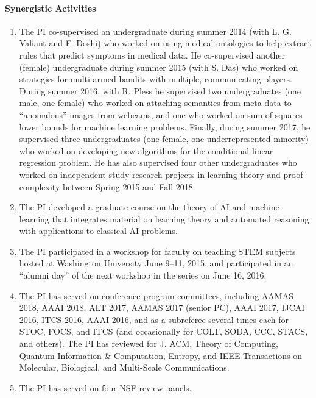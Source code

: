 \documentclass[12pt]{article}
\begin{document}
\paragraph{Synergistic Activities}
\begin{enumerate}
\item The PI co-supervised an undergraduate during summer 2014 (with L. G. 
Valiant and F. Doshi) who worked on using medical ontologies to help extract 
rules that predict symptoms in medical data. He co-supervised another
(female) undergraduate during summer 2015 (with S. Das) who worked on strategies
for multi-armed bandits with multiple, communicating players. During
summer 2016, with R. Pless he supervised two undergraduates (one male, one female) who worked
on attaching semantics from meta-data to ``anomalous'' images from webcams, and one who worked on sum-of-squares lower bounds for
machine learning problems. Finally, during summer 2017, he supervised three undergraduates (one female, one underrepresented minority) who worked on developing new algorithms for the conditional linear regression problem. He has also supervised four other undergraduates who
worked on independent study research projects in learning theory and proof
complexity between Spring 2015 and Fall 2018.
\item The PI developed a graduate course on the theory of AI and machine learning that integrates material on learning theory and automated reasoning with applications to classical AI problems.
\item The PI participated in a workshop for faculty on teaching STEM subjects 
hosted at Washington University June 9--11, 2015, and participated in an 
``alumni day'' of the next workshop in the series on June 16, 2016.
\item The PI has served on conference program committees, including AAMAS 2018, AAAI 2018, ALT 2017, AAMAS 2017 (senior PC), AAAI 2017, IJCAI 2016, ITCS 2016, AAAI 2016, and as a subreferee several times each for STOC, FOCS, and ITCS (and
occasionally for COLT, SODA, CCC, STACS, and others).
The PI has reviewed for J. ACM, Theory
of Computing, Quantum Information \& Computation, Entropy, and IEEE Transactions on
Molecular, Biological, and Multi-Scale Communications.
\item The PI has served on four NSF review panels.
\end{enumerate}
\end{document}
